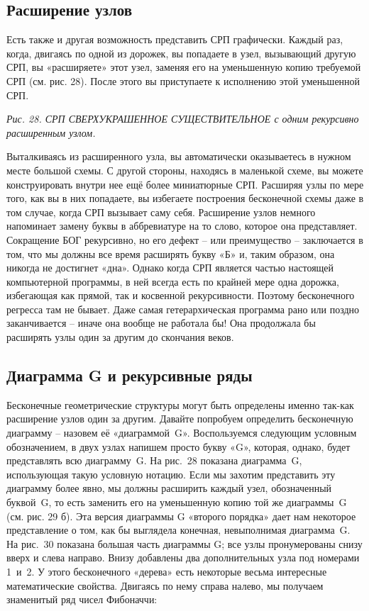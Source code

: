 \documentclass[../main.tex]{subfiles}
\begin{document}
\subsection{Расширение узлов}

Есть также и другая возможность представить СРП графически. Каждый раз, когда, двигаясь по одной из дорожек, вы попадаете в узел, вызывающий другую СРП, вы «расширяете» этот узел, заменяя его на уменьшенную копию требуемой СРП (см. рис. 28). После этого вы приступаете к исполнению этой уменьшенной СРП\@.

\emph{Рис. 28. СРП СВЕРХУКРАШЕННОЕ СУЩЕСТВИТЕЛЬНОЕ с одним рекурсивно расширенным узлом.}

Выталкиваясь из расширенного узла, вы автоматически оказываетесь в нужном месте большой схемы. С другой стороны, находясь в маленькой схеме, вы можете конструировать внутри нее ещё более миниатюрные СРП\@. Расширяя узлы по мере того, как вы в них попадаете, вы избегаете построения бесконечной схемы даже в том случае, когда СРП вызывает саму себя. Расширение узлов немного напоминает замену буквы в аббревиатуре на то слово, которое она представляет. Сокращение БОГ рекурсивно, но его дефект \--- или преимущество \--- заключается в том, что мы должны все время расширять букву «Б» и, таким образом, она никогда не достигнет «дна». Однако когда СРП является частью настоящей компьютерной программы, в ней всегда есть по крайней мере одна дорожка, избегающая как прямой, так и косвенной рекурсивности. Поэтому бесконечного регресса там не бывает. Даже самая гетерархическая программа рано или поздно заканчивается \--- иначе она вообще не работала бы! Она продолжала бы расширять узлы один за другим до скончания веков.


\subsection{Диаграмма G и рекурсивные ряды}

Бесконечные геометрические структуры могут быть определены именно так-как расширение узлов один за другим. Давайте попробуем определить бесконечную диаграмму \--- назовем её «диаграммой~G». Воспользуемся следующим условным обозначением, в двух узлах напишем просто букву «G», которая, однако, будет представлять всю диаграмму~G\@. На рис.~28 показана диаграмма~G, использующая такую условную нотацию. Если мы захотим представить эту диаграмму более явно, мы должны расширить каждый узел, обозначенный буквой~G, то есть заменить его на уменьшенную копию той же диаграммы~G (см. рис. 29 б). Эта версия диаграммы G «второго порядка» дает нам некоторое представление о том, как бы выглядела конечная, невыполнимая диаграмма~G\@. На рис.~30 показана большая часть диаграммы G; все узлы пронумерованы снизу вверх и слева направо. Внизу добавлены два дополнительных узла под номерами 1~и~2. У этого бесконечного «дерева» есть некоторые весьма интересные математические свойства. Двигаясь по нему справа налево, мы получаем знаменитый ряд чисел Фибоначчи:
\end{document}
